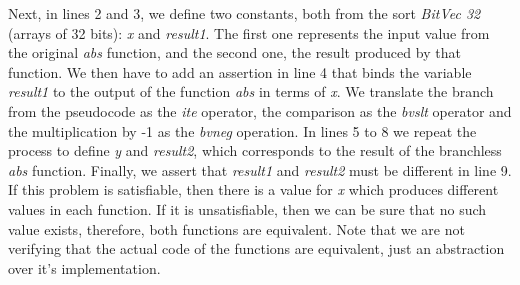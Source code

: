 Next, in lines 2 and 3, we define two constants, both from the sort \textit{BitVec 32} (arrays of 32 bits): \textit{x} and \textit{result1}. The first one represents the input value from the original \textit{abs} function, and the second one, the result produced by that function. We then have to add an assertion in line 4 that binds the variable \textit{result1} to the output of the function \textit{abs} in terms of \textit{x}. We translate the branch from the pseudocode as the \textit{ite} operator, the comparison as the \textit{bvslt} operator and the multiplication by -1 as the \textit{bvneg} operation. In lines 5 to 8 we repeat the process to define \textit{y} and \textit{result2}, which corresponds to the result of the branchless \textit{abs} function. Finally, we assert that \textit{result1} and \textit{result2} must be different in line 9. If this problem is satisfiable, then there is a value for \textit{x} which produces different values in each function. If it is unsatisfiable, then we can be sure that no such value exists, therefore, both functions are equivalent. Note that we are not verifying that the actual code of the functions are equivalent, just an abstraction over it's implementation.

%

